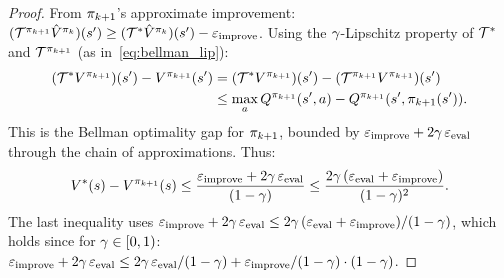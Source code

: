 \documentclass[11pt,a4paper]{article}
\begin{document}
\begin{proof}
From $\pi_{k+1}$'s approximate improvement:
$(\mathcal{T}^{\pi_{k+1}} \hat{V}^{\pi_k})(s')
\geq (\mathcal{T}^* \hat{V}^{\pi_k})(s')
- \varepsilon_{\mathrm{improve}}$. Using the $\gamma$-Lipschitz
property of $\mathcal{T}^*$ and $\mathcal{T}^{\pi_{k+1}}$ (as
in~\eqref{eq:bellman_lip}):
\begin{align}
  (\mathcal{T}^* V^{\pi_{k+1}})(s')
  - V^{\pi_{k+1}}(s')
  &= (\mathcal{T}^* V^{\pi_{k+1}})(s')
  - (\mathcal{T}^{\pi_{k+1}} V^{\pi_{k+1}})(s') \nonumber\\
  &\leq \max_a Q^{\pi_{k+1}}(s',a) - Q^{\pi_{k+1}}(s',
  \pi_{k+1}(s')).
  \label{eq:bellman_gap}
\end{align}
This is the Bellman optimality gap for $\pi_{k+1}$, bounded by
$\varepsilon_{\mathrm{improve}} + 2\gamma\,
\varepsilon_{\mathrm{eval}}$
through the chain of approximations. Thus:
\begin{equation}
  V^*(s) - V^{\pi_{k+1}}(s)
  \leq \frac{\varepsilon_{\mathrm{improve}}
  + 2\gamma\,\varepsilon_{\mathrm{eval}}}{(1-\gamma)}
  \leq \frac{2\gamma\,(\varepsilon_{\mathrm{eval}}
  + \varepsilon_{\mathrm{improve}})}{(1-\gamma)^2}.
\end{equation}
The last inequality uses
$\varepsilon_{\mathrm{improve}}
+ 2\gamma\,\varepsilon_{\mathrm{eval}}
\leq 2\gamma\,(\varepsilon_{\mathrm{eval}}
+ \varepsilon_{\mathrm{improve}})/(1-\gamma)$,
which holds since for $\gamma \in [0,1)$:
$\varepsilon_{\mathrm{improve}} + 2\gamma\,\varepsilon_{\mathrm{eval}}
\leq 2\gamma\,\varepsilon_{\mathrm{eval}}/(1-\gamma)
+ \varepsilon_{\mathrm{improve}}/(1-\gamma) \cdot (1-\gamma)$.


\end{proof}
\end{document}
